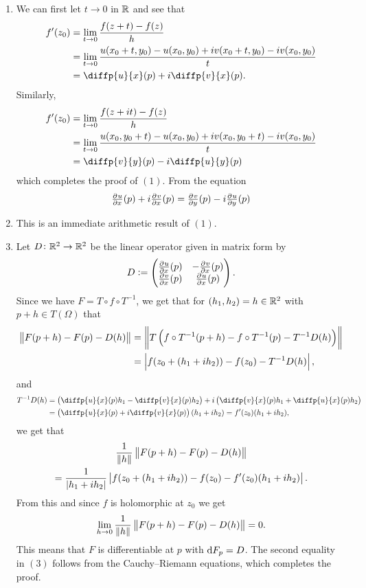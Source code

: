 \documentclass[11pt,a4paper]{article}
\begin{document}
\begin{proofof}{} \phantom{}
\begin{enumerate}
  \item[(1)] We can first let $t \to 0$ in $\mathbb{R}$ and see that
  \begin{align*}
    f'(z_0) &= \lim_{t \to 0} \frac{f(z + t) - f(z)}{h} \\
            &= \lim_{t \to 0} \frac{u(x_0 + t, y_0) - u(x_0,y_0) + 
            i v(x_0 + t, y_0) - i v(x_0,y_0)}{t} \\
            &= \diffp{u}{x}(p) + i \diffp{v}{x}(p).
  \end{align*}
  Similarly,
  \begin{align*}
    f'(z_0) &= \lim_{t \to 0} \frac{f(z + i t) - f(z)}{h} \\
            &= \lim_{t \to 0} \frac{u(x_0, y_0 + t) - u(x_0,y_0) + 
            i v(x_0, y_0 + t) - i v(x_0,y_0)}{t} \\
            &= \diffp{v}{y}(p) - i \diffp{u}{y}(p)
  \end{align*}
  which completes the proof of $(1)$.
  From the equation
  \[
     \pd{u}{x}(p) + i \pd{v}{x}(p) = \pd{v}{y}(p) - i \pd{u}{y}(p)
  \]
  \item[(2)] This is an immediate arithmetic result of $(1)$.
  \item[(3)] Let $D \colon \mathbb{R}^2 \to \mathbb{R}^2$ be the linear operator given
    in matrix form by
    \[
      D :=
      \begin{pmatrix}
        \pd{u}{x}(p) & - \pd{v}{x}(p) \\
        \pd{v}{x}(p) & \pd{u}{x}(p) 
      \end{pmatrix}.
    \]
    Since we have $F = T \circ f \circ T^{-1}$,
    we get that for $(h_1,h_2) = h \in \mathbb{R}^2$ with $p + h \in T(\Omega)$ that
    \begin{align*}
      \norm{F(p + h) - F(p) - D(h)} &=
      \norm{T\del{f \circ T^{-1}(p + h) - f \circ T^{-1}(p) - T^{-1} D(h)}} \\
      &= \abs{f(z_0 + (h_1 + i h_2)) - f(z_0) - T^{-1} D(h)},
    \end{align*}
    and
    \begin{align*}
      T^{-1} D(h) &=
      \del{\diffp{u}{x}(p) h_1 - \diffp{v}{x}(p) h_2} + i
      \del{\diffp{v}{x}(p) h_1 + \diffp{u}{x}(p) h_2} \\ &=
      \del{\diffp{u}{x}(p) + i \diffp{v}{x}(p)} (h_1 + i h_2) =
      f'(z_0) (h_1 + i h_2),
    \end{align*}
    we get that
    \begin{multline*}
      \frac{1}{\left\lVert h\right\rVert} \left\lVert F(p + h) - F(p) - D(h)\right\rVert \\ =
      \frac{1}{\left\lvert h_1 + i h_2\right\rvert}
      \left\lvert f(z_0 + (h_1 + i h_2)) - f(z_0) - f'(z_0) (h_1 + i h_2)\right\rvert.
    \end{multline*}
    From this and since $f$ is holomorphic at $z_0$ we get
    \[
      \lim_{h \to 0} \frac{1}{\left\lVert h\right\rVert} \left\lVert F(p + h) - F(p) - D(h)\right\rVert = 0.
    \]
    This means that $F$ is differentiable at $p$ with $\mathrm{d} F_p = D$.
    The second equality in $(3)$ follows from the Cauchy--Riemann equations,
    which completes the proof.
\end{enumerate}
\end{proofof}
\end{document}
